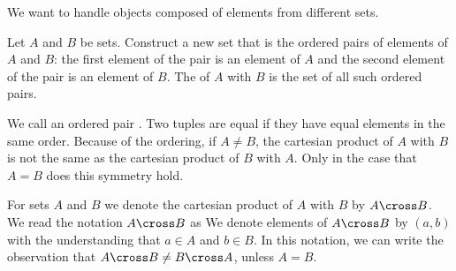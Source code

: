 
\sbasic



\sstart



We want to handle objects composed of elements from different sets.


Let $A$ and $B$ be sets.
Construct a new set that is the ordered pairs of elements of $A$ and $B$: the first element of the pair is an element of $A$ and the second element of the pair is an element of $B$.
The  of $A$ with $B$ is the set of all such ordered pairs.

We call an ordered pair .
Two tuples are equal if they have equal elements in the same order.
Because of the ordering, if $A \neq B$, the cartesian product of $A$ with $B$ is not the same as the cartesian product of $B$ with $A$.
Only in the case that $A = B$ does this symmetry hold.

For sets $A$ and $B$ we denote the cartesian product of $A$ with $B$ by $A \cross B$.
We read the notation $A \cross B$ as 
We denote elements of $A \cross B$ by $(a, b)$ with the understanding that $a \in A$ and $b \in B$.
In this notation, we can write the observation that $A \cross B \neq B \cross A$, unless $A = B$.

\strats
